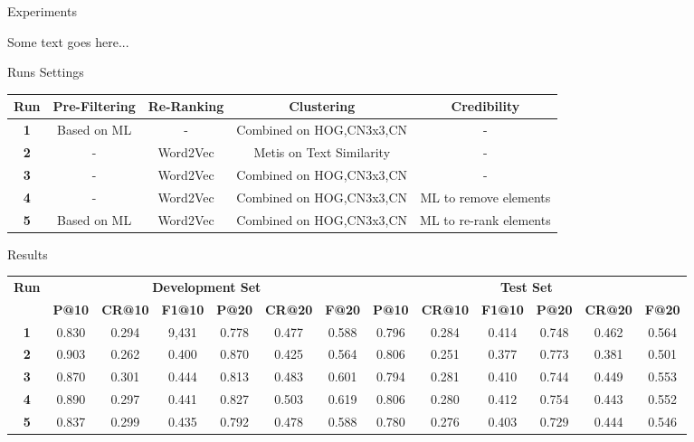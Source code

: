
\begin{section}{Experiments}

Some text goes here...

\begin{subsection}{Runs Settings}

\blindtext[1]
\begin{table*}[htb]
\scriptsize
\begin{tabular}{c|c|c|c|c}
\toprule 
\textbf{Run} & \textbf{Pre-Filtering} & \textbf{Re-Ranking} & \textbf{Clustering} & \textbf{Credibility}\tabularnewline
\midrule
\textbf{1} & Based on ML & - & Combined on HOG,CN3x3,CN & -\tabularnewline
\textbf{2} & - & Word2Vec & Metis on Text Similarity & -\tabularnewline
\textbf{3} & - & Word2Vec & Combined on HOG,CN3x3,CN & -\tabularnewline
\textbf{4} & - & Word2Vec & Combined on HOG,CN3x3,CN & ML to remove elements\tabularnewline
\textbf{5} & Based on ML & Word2Vec & Combined on HOG,CN3x3,CN & ML to re-rank elements\tabularnewline
\bottomrule 
\end{tabular}
\end{table*}

\end{subsection}

\begin{subsection}{Results}
\blindtext[1]

\begin{table*}[hbt]
\scriptsize
\begin{tabular}{c|c|c|c|c|c|c|c|c|c|c|c|c}
\toprule 
\multirow{2}{*}{\textbf{Run}} & \multicolumn{6}{c|}{\textbf{Development Set}} & \multicolumn{6}{c}{\textbf{Test Set}}\tabularnewline
\cmidrule{2-13} 
 & \textbf{P@10} & \textbf{CR@10} & \textbf{F1@10} & \textbf{P@20} & \textbf{CR@20} & \textbf{F@20} & \textbf{P@10} & \textbf{CR@10} & \textbf{F1@10} & \textbf{P@20} & \textbf{CR@20} & \textbf{F@20}\tabularnewline
\midrule
\textbf{1} & 0.830 & 0.294 & 9,431 & 0.778 & 0.477 & 0.588 & 0.796 & 0.284  & 0.414  & 0.748  & 0.462  & 0.564\tabularnewline
\textbf{2} & 0.903 & 0.262 & 0.400 & 0.870 & 0.425 & 0.564 & 0.806 & 0.251  & 0.377  & 0.773  & 0.381  & 0.501\tabularnewline
\textbf{3} & 0.870 & 0.301 & 0.444 & 0.813 & 0.483 & 0.601 & 0.794 & 0.281  & 0.410  & 0.744  & 0.449  & 0.553\tabularnewline
\textbf{4} & 0.890 & 0.297 & 0.441 & 0.827 & 0.503 & 0.619 & 0.806 & 0.280 & 0.412 & 0.754  & 0.443 &  0.552\tabularnewline
\textbf{5} & 0.837 & 0.299 & 0.435 & 0.792 & 0.478 & 0.588 & 0.780 & 0.276 & 0.403 & 0.729 & 0.444 &  0.546\tabularnewline
\bottomrule 
\end{tabular}
\end{table*}


\end{subsection}

\end{section}

